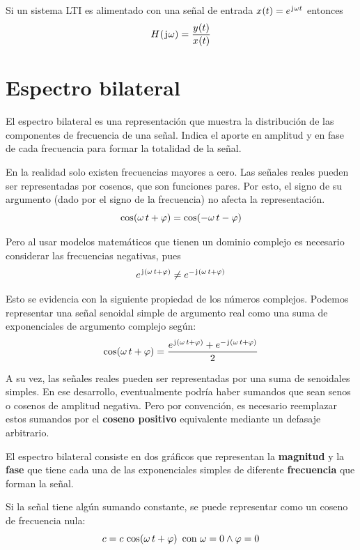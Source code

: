 \begin{mdframed}[style=PropertyFrame]
    \begin{prop}
        \label{prop:funcionDeTransferencia}
    \end{prop}
    Si un sistema LTI es alimentado con una señal de entrada $\fx[x]{t} = \complexExp$ entonces
    \[
        \fx[H]{\iu \omega} = \frac{\fx[y]{t}}{\fx[x]{t}}
    \]
\end{mdframed}

\section{Espectro bilateral}

El espectro bilateral es una representación que muestra la distribución de las componentes de frecuencia de una señal.
Indica el aporte en amplitud y en fase de cada frecuencia para formar la totalidad de la señal.

En la realidad solo existen frecuencias mayores a cero.
Las señales reales pueden ser representadas por cosenos, que son funciones pares.
Por esto, el signo de su argumento (dado por el signo de la frecuencia) no afecta la representación.
\[
    \fx[\cos]{\omega \, t + \varphi} = \fx[\cos]{- \omega \, t - \varphi}
\]

Pero al usar modelos matemáticos que tienen un dominio complejo es necesario considerar las frecuencias negativas, pues
\[
    e^{\iu (\omega \, t + \varphi)} \neq e^{- \iu (\omega \, t + \varphi)}
\]

Esto se evidencia con la siguiente propiedad de los números complejos.
Podemos representar una señal senoidal simple de argumento real como una suma de exponenciales de argumento complejo según:
\[
    \fx[\cos]{\omega \, t + \varphi} = \frac{e^{\iu (\omega \, t + \varphi)} + e^{- \iu (\omega \, t + \varphi)}}{2}
\]

A su vez, las señales reales pueden ser representadas por una suma de senoidales simples.
En ese desarrollo, eventualmente podría haber sumandos que sean senos o cosenos de amplitud negativa.
Pero por convención, es necesario reemplazar estos sumandos por el \textbf{coseno positivo} equivalente mediante un defasaje arbitrario.

El espectro bilateral consiste en dos gráficos que representan la \textbf{magnitud} y la \textbf{fase} que tiene cada una de las exponenciales simples de diferente \textbf{frecuencia} que forman la señal.

Si la señal tiene algún sumando constante, se puede representar como un coseno de frecuencia nula:
\[
    c = c \, \fx[\cos]{\omega \, t + \varphi} \text{ con } \omega = 0 \land \varphi = 0
\]

